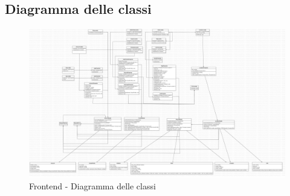 \subsection{Diagramma delle classi}
\begin{figure}[!h]
    \includegraphics[width=16cm]{sezioni/images/Main.jpg}
    \centering
    \caption{Frontend - Diagramma delle classi}
\end{figure}


